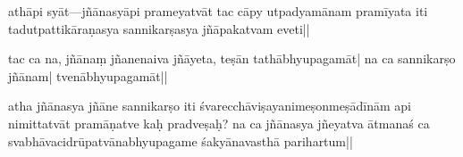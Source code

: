 athā\mds pi syāt\mde ---jñānasyāpi prameyatvāt tac cāpy utpadyamānam pramīyata iti tadutpattikāraṇasya sannikarṣasya jñāpakatvam eveti||

tac ca na, jñāna\mds ṃ jñanenaiva jñāyeta\mde, teṣān tathābhyupagamāt| 
%
na ca sannikarṣo jñānam| tvenābhyupagamāt||

atha jñānasya jñāne sannikarṣo  iti %
śvare\-cchāviṣayanimeṣonmeṣādīnām %
api nimi\mds ttatvāt \mde pramāṇatve kaḥ pradveṣaḥ? na ca jñānasya jñeyatva ātmanaś ca svabhāvacidrūpatvānabhyupagame śakyānavasthā parihartum||

